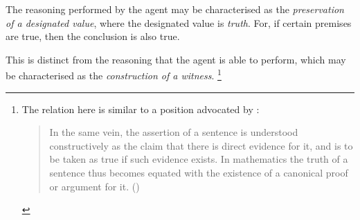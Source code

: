 \documentclass[10pt]{article}
\begin{document}
\begin{note}

  The reasoning performed by the agent may be characterised as the \emph{preservation of a designated value}, where the designated value is \emph{truth}.
  For, if certain premises are true, then the conclusion is also true.

  This is distinct from the reasoning that the agent is able to perform, which may be characterised as the \emph{construction of a witness}.\nolinebreak
  \footnote{
    The relation here is similar to a position advocated by \citeauthor{Prawitz:2005aa}:
    \begin{quote}
      In the same vein, the assertion of a sentence is understood constructively as the claim that there is direct evidence for it, and is to be taken as true if such evidence exists.
      In mathematics the truth of a sentence thus becomes equated with the existence of a canonical proof or argument for it.\nolinebreak
      \mbox{}\hfill\mbox{(\citeauthor[692]{Prawitz:2005aa})}
    \end{quote}

}
\end{note}
\end{document}
